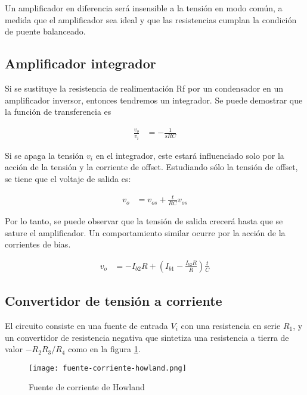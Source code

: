 Un amplificador en diferencia será insensible a la tensión en modo común,
a medida que el amplificador sea ideal y que las resistencias cumplan la
condición de puente balanceado.

\subsection{Amplificador integrador}

Si se sustituye la resistencia de realimentación Rf por un condensador en un amplificador inversor, entonces tendremos un integrador. Se puede demostrar que la función de transferencia es

\begin{align*}
\frac{v_o}{v_i} &= -\frac{1}{sRC}
\end{align*}

Si se apaga la tensión $v_i$ en el integrador, este estará influenciado solo por la acción de la tensión y la corriente de offset. Estudiando sólo la tensión de offset, se tiene que el voltaje de salida es:

\begin{align*}
v_o &= v_{os} + \frac{t}{RC} v_{os}
\end{align*}

Por lo tanto, se puede observar que la tensión de salida crecerá hasta que se sature el amplificador. Un comportamiento similar ocurre por la acción de la corrientes de bias.

\begin{align*}
v_o &= -I_{b2}R + \left( I_{b1} - \frac{I_{b2}R}{R} \right) \frac{t}{C}
\end{align*}

\subsection{Convertidor de tensión a corriente}

El circuito consiste en una fuente de entrada $V_i$ con una resistencia en serie $R_1$, y un convertidor de resistencia negativa que sintetiza una resistencia a tierra de valor $-R_2 R_3 / R_4$ como en la figura \ref{fig:mt-fuente-corriente-howland}.

\begin{figure}
    \centering
    \texttt{[image: fuente-corriente-howland.png]}
    \caption{Fuente de corriente de Howland}
    \label{fig:mt-fuente-corriente-howland}
\end{figure}

